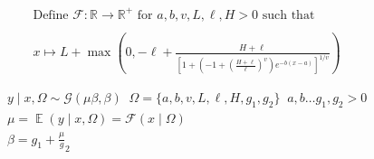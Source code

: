 \documentclass[a4paper,12pt]{article}
\DeclareMathOperator{\E}{\mathbb{E}}
\begin{document}
    \begin{align*}
        &\text{Define } \mathcal{F}: \mathbb{R} \to \mathbb{R}^{+} \text{ for } a, b, v, L, \ell, H > 0 \text{ such that } \\\\
        &x \mapsto L + \max\left(0, -\ell + \frac{H + \ell}{\left[1 + \left(-1 + \left(\frac{H + \ell}{\ell}\right)^{v}\right)e^{-b(x-a)}\right]^{1/v}} \right) \tag{4.2.1}
    \end{align*}


    \begin{align*}
    &y \mid x, \Omega \sim \mathcal{G}\left(\mu\beta, \beta\right) \;\; \Omega = \{ a, b, v, L, \ell, H, g_1, g_2\} \;\;a, b \ldots g_1, g_2  > 0 \tag{4.2.2} \\
    &\mu = \E\left(y \mid x, \Omega\right) = \mathcal{F}\left(x \mid \Omega\right) \tag{4.2.3}\\
    &\beta = g_1 + \frac{\mu}g_2 \tag{4.2.4}\\
    \end{align*}
\end{document}
